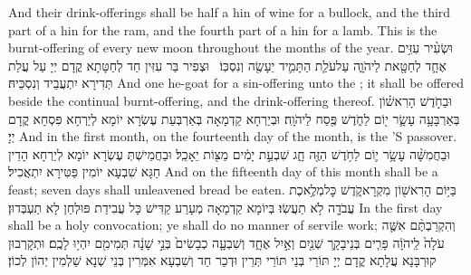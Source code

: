 {And their drink-offerings shall be half a hin of wine for a bullock, and the third part of a hin for the ram, and the fourth part of a hin for a lamb. This is the burnt-offering of every new moon throughout the months of the year.}{}
{וּשְׂעִ֨יר עִזִּ֥ים אֶחָ֛ד לְחַטָּ֖את לַיהֹוָ֑ה עַל\maqqaf עֹלַ֧ת הַתָּמִ֛יד יֵעָשֶׂ֖ה וְנִסְכּֽוֹ׃ \setuma }
{וּצְפִיר בַּר עִזִּין חַד לְחַטָּתָא קֳדָם יְיָ עַל עֲלַת תְּדִירָא יִתְעֲבֵיד וְנִסְכֵּיהּ׃}
{And one he-goat for a sin-offering unto the \lord; it shall be offered beside the continual burnt-offering, and the drink-offering thereof.}{}
{וּבַחֹ֣דֶשׁ הָרִאשׁ֗וֹן בְּאַרְבָּעָ֥ה עָשָׂ֛ר י֖וֹם לַחֹ֑דֶשׁ פֶּ֖סַח לַיהֹוָֽה׃}
{וּבְיַרְחָא קַדְמָאָה בְּאַרְבְּעַת עֶשְׂרָא יוֹמָא לְיַרְחָא פִּסְחָא קֳדָם יְיָ׃}
{And in the first month, on the fourteenth day of the month, is the \lord’S passover.}{}
{וּבַחֲמִשָּׁ֨ה עָשָׂ֥ר י֛וֹם לַחֹ֥דֶשׁ הַזֶּ֖ה חָ֑ג שִׁבְעַ֣ת יָמִ֔ים מַצּ֖וֹת יֵאָכֵֽל׃}
{וּבַחֲמֵישְׁתְּ עֶשְׂרָא יוֹמָא לְיַרְחָא הָדֵין חַגָּא שִׁבְעָא יוֹמִין פַּטִּירָא יִתְאֲכִיל׃}
{And on the fifteenth day of this month shall be a feast; seven days shall unleavened bread be eaten.}{}
{בַּיּ֥וֹם הָרִאשׁ֖וֹן מִקְרָא\maqqaf קֹ֑דֶשׁ כׇּל\maqqaf מְלֶ֥אכֶת עֲבֹדָ֖ה לֹ֥א תַעֲשֽׂוּ׃}
{בְּיוֹמָא קַדְמָאָה מְעָרַע קַדִּישׁ כָּל עֲבִידַת פּוּלְחַן לָא תַעְבְּדוּן׃}
{In the first day shall be a holy convocation; ye shall do no manner of servile work;}{}
{וְהִקְרַבְתֶּ֨ם אִשֶּׁ֤ה עֹלָה֙ לַֽיהֹוָ֔ה פָּרִ֧ים בְּנֵי\maqqaf בָקָ֛ר שְׁנַ֖יִם וְאַ֣יִל אֶחָ֑ד וְשִׁבְעָ֤ה כְבָשִׂים֙ בְּנֵ֣י שָׁנָ֔ה תְּמִימִ֖ם יִהְי֥וּ לָכֶֽם׃}
{וּתְקָרְבוּן קוּרְבָּנָא עֲלָתָא קֳדָם יְיָ תּוֹרֵי בְּנֵי תּוֹרֵי תְּרֵין וּדְכַר חַד וְשִׁבְעָא אִמְּרִין בְּנֵי שְׁנָא שַׁלְמִין יְהוֹן לְכוֹן׃}
